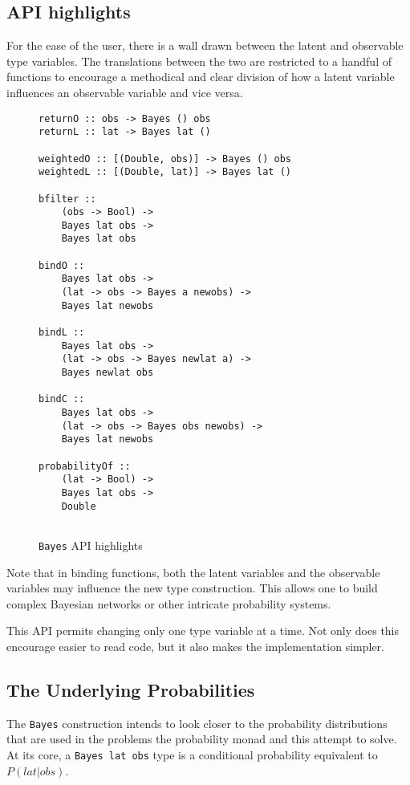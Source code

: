 \documentclass[10pt,twocolumn]{article}
\begin{document}
\subsection{API highlights}
For the ease of the user, there is a wall drawn between the latent and observable type variables. The translations between the two are restricted to a handful of functions to encourage a methodical and clear division of how a latent variable influences an observable variable and vice versa.

\begin{figure}
\begin{verbatim}
returnO :: obs -> Bayes () obs
returnL :: lat -> Bayes lat ()

weightedO :: [(Double, obs)] -> Bayes () obs
weightedL :: [(Double, lat)] -> Bayes lat ()

bfilter ::
    (obs -> Bool) ->
    Bayes lat obs ->
    Bayes lat obs

bindO ::
    Bayes lat obs ->
    (lat -> obs -> Bayes a newobs) ->
    Bayes lat newobs

bindL ::
    Bayes lat obs ->
    (lat -> obs -> Bayes newlat a) ->
    Bayes newlat obs

bindC ::
    Bayes lat obs ->
    (lat -> obs -> Bayes obs newobs) ->
    Bayes lat newobs

probabilityOf ::
    (lat -> Bool) ->
    Bayes lat obs ->
    Double
    
\end{verbatim}
\caption{\texttt{Bayes} API highlights}
\end{figure}
Note that in binding functions, both the latent variables and the observable variables may influence the new type construction. This allows one to build complex Bayesian networks or other intricate probability systems.

This API permits changing only one type variable at a time. Not only does this encourage easier to read code, but it also makes the implementation simpler.

\subsection{The Underlying Probabilities}
The \texttt{Bayes} construction intends to look closer to the probability distributions that are used in the problems the probability monad and this attempt to solve. At its core, a \texttt{Bayes lat obs} type is a conditional probability equivalent to $P(lat | obs)$.
\end{document}
